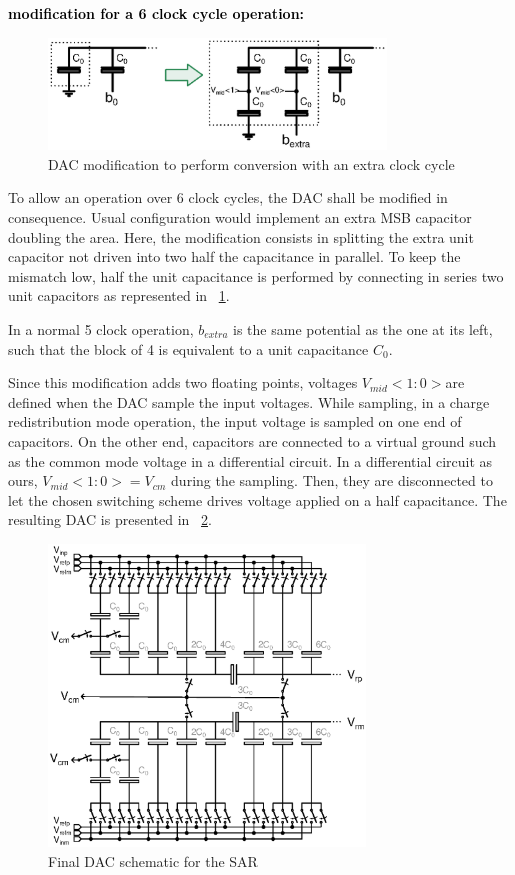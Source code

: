 \textbf{\textcolor{black}{modification for a 6 clock cycle operation:}}
\begin{figure}[htp]
	\centering
	\includegraphics[width=0.8\textwidth]{Chapter4/Figs/sar-extra-clock-cycle.ps}
	\caption{DAC modification to perform conversion with an extra clock cycle}
	\label{fig:sar-dac-extra}
\end{figure}
To allow an operation over 6 clock cycles, the DAC shall be modified in consequence. Usual configuration would implement an extra MSB capacitor doubling the area. Here, the modification consists in splitting the extra unit capacitor not driven into two half the capacitance in parallel. To keep the mismatch low, half the unit capacitance is performed by connecting in series two unit capacitors as represented in \figurename~\ref{fig:sar-dac-extra}.


In a normal 5 clock operation, \(b_{extra}\) is the same potential as the one at its left, such that the block of 4 is equivalent to a unit capacitance \(C_0 \).

Since this modification adds two floating points, voltages \(V_{mid}<1:0> \)are defined when the DAC sample the input voltages. While sampling, in a charge redistribution mode operation, the input voltage is sampled on one end of capacitors. On the other end, capacitors are connected to a virtual ground such as the common mode voltage in a differential circuit. In a differential circuit as ours, \(V_{mid}<1:0> = V_{cm}\) during the sampling. Then, they are disconnected to let the chosen switching scheme drives voltage applied on a half capacitance. The resulting DAC is presented in \figurename~\ref{fig:sar-dac-full}.

\begin{figure}[htp]
	\centering
	\includegraphics[width=0.75\textwidth]{Chapter4/Figs/sar-dac-full.ps}
	\caption{Final DAC schematic for the SAR}
	\label{fig:sar-dac-full}
\end{figure}

